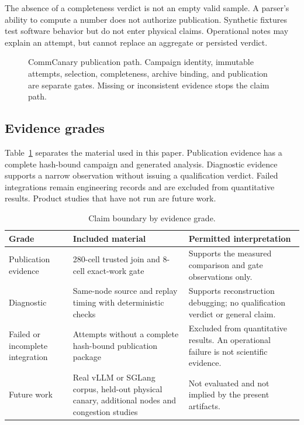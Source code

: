 \documentclass[10pt,twocolumn]{article}
\begin{document}
The absence of a completeness verdict is not an empty valid sample. A parser's
ability to compute a number does not authorize publication. Synthetic fixtures
test software behavior but do not enter physical claims. Operational notes may
explain an attempt, but cannot replace an aggregate or persisted verdict.

\begin{figure}[t]
  \centering
  \resizebox{0.96\textwidth}{!}{}
  \caption{CommCanary publication path. Campaign identity, immutable attempts,
  selection, completeness, archive binding, and publication are separate
  gates. Missing or inconsistent evidence stops the claim path.}
  \label{fig:path}
\end{figure}

\subsection{Evidence grades}

Table~\ref{tab:grades} separates the material used in this paper. Publication
evidence has a complete hash-bound campaign and generated analysis. Diagnostic
evidence supports a narrow observation without issuing a qualification verdict.
Failed integrations remain engineering records and are excluded from
quantitative results. Product studies that have not run are future work.

\begin{table}[t]
\caption{Claim boundary by evidence grade.}
\label{tab:grades}
\centering\small
\begin{tabularx}{\textwidth}{@{}p{}p{}X@{}}
\toprule
Grade & Included material & Permitted interpretation \\
\midrule
Publication evidence & 280-cell trusted join and 8-cell exact-work gate &
Supports the measured comparison and gate observations only. \\
Diagnostic & Same-node source and replay timing with deterministic checks &
Supports reconstruction debugging; no qualification verdict or general claim. \\
Failed or incomplete integration & Attempts without a complete hash-bound
publication package & Excluded from quantitative results. An operational
failure is not scientific evidence. \\
Future work & Real vLLM or SGLang corpus, held-out physical canary, additional
nodes and congestion studies & Not evaluated and not implied by the present
artifacts. \\
\bottomrule
\end{tabularx}
\end{table}
\end{document}
